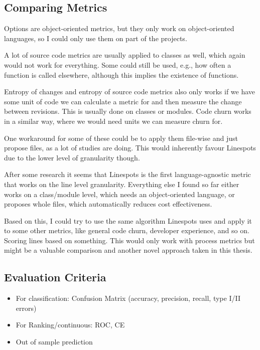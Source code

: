 \subsection{Comparing Metrics}
\label{subsec:comparing_metric}

Options are object-oriented metrics, but they only work on object-oriented languages, so I could only use them on part of the projects.

A lot of source code metrics are usually applied to classes as well, which again would not work for everything. Some could still be used, e.g., how often a function is called elsewhere, although this implies the existence of functions.

Entropy of changes and entropy of source code metrics also only works if we have some unit of code we can calculate a metric for and then measure the change between revisions. This is usually done on classes or modules.
Code churn works in a similar way, where we would need units we can measure churn for.

One workaround for some of these could be to apply them file-wise and just propose files, as a lot of studies are doing. This would inherently favour Linespots due to the lower level of granularity though.

After some research it seems that Linespots is the first language-agnostic metric that works on the line level granularity. Everything else I found so far either works on a class\slash module level, which needs an object-oriented language, or proposes whole files, which automatically reduces cost effectiveness.

Based on this, I could try to use the same algorithm Linespots uses and apply it to some other metrics, like general code churn, developer experience, and so on. Scoring lines based on something. This would only work with process metrics but might be a valuable comparison and another novel approach taken in this thesis.

\subsection{Evaluation Criteria}

\begin{itemize}
    \item For classification: Confusion Matrix (accuracy, precision, recall, type I/II errors)
    \item For Ranking/continuous: ROC, CE
    \item Out of sample prediction
\end{itemize}
\cite{ARISHOLM20102}

